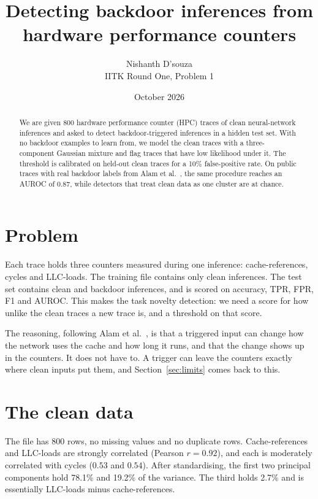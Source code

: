 \documentclass[11pt,a4paper]{article}
\title{Detecting backdoor inferences from hardware performance counters}
\author{Nishanth D'souza\\[2pt] \small IITK Round One, Problem 1}
\date{October 2026}
\begin{document}
\maketitle

\begin{abstract}
\noindent
We are given 800 hardware performance counter (HPC) traces of clean neural-network inferences and asked to detect
backdoor-triggered inferences in a hidden test set. With no backdoor examples to learn from, we model the clean
traces with a three-component Gaussian mixture and flag traces that have low likelihood under it. The threshold is
calibrated on held-out clean traces for a 10\% false-positive rate. On public traces with real backdoor labels from
Alam et al.~\cite{alam2024}, the same procedure reaches an AUROC of 0.87, while detectors that treat clean data as
one cluster are at chance.
\end{abstract}

\section{Problem}

Each trace holds three counters measured during one inference: cache-references, cycles and LLC-loads. The
training file contains only clean inferences. The test set contains clean and backdoor inferences, and is scored on
accuracy, TPR, FPR, F1 and AUROC. This makes the task novelty detection: we need a score for how unlike the clean
traces a new trace is, and a threshold on that score.

The reasoning, following Alam et al.~\cite{alam2024}, is that a triggered input can change how the network uses
the cache and how long it runs, and that the change shows up in the counters. It does not have to. A trigger can
leave the counters exactly where clean inputs put them, and Section~\ref{sec:limits} comes back to this.

\section{The clean data}

The file has 800 rows, no missing values and no duplicate rows. Cache-references and LLC-loads are strongly
correlated (Pearson $r = 0.92$), and each is moderately correlated with cycles ($0.53$ and $0.54$). After
standardising, the first two principal components hold 78.1\% and 19.2\% of the variance. The third holds 2.7\%
and is essentially LLC-loads minus cache-references.
\end{document}
